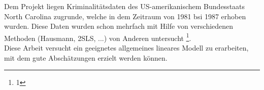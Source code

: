 Dem Projekt liegen Kriminalitätsdaten des US-amerikanischem Bundesstaats North Carolina zugrunde, welche in dem Zeitraum von 1981 bsi 1987 erhoben wurden.
Diese Daten wurden schon mehrfach mit Hilfe von verschiedenen Methoden (Hausmann, 2SLS, ...) von Anderen untersucht \footnote{1}. \\
Diese Arbeit versucht ein geeignetes allgemeines lineares Modell zu erarbeiten, mit dem gute Abschätzungen erzielt werden können.